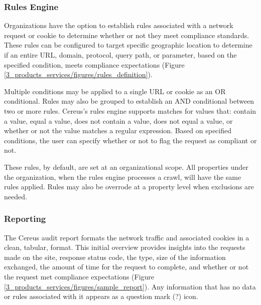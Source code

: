 
\subsubsection{Rules Engine}

Organizations have the option to establish rules associated with a network request or cookie to determine whether or not they meet compliance standards. These rules can be configured to target specific geographic location to determine if an entire URL, domain, protocol, query path, or parameter, based on the specified condition, meets compliance expectations (Figure \ref{3_products_services/figures/rules_definition}).

Multiple conditions may be applied to a single URL or cookie as an OR conditional. Rules may also be grouped to establish an AND conditional between two or more rules. Cereus's rules engine supports matches for values that: contain a value, equal a value, does not contain a value, does not equal a value, or whether or not the value matches a regular expression. Based on specified conditions, the user can specify whether or not to flag the request as compliant or not.


These rules, by default, are set at an organizational scope. All properties under the organization, when the rules engine processes a crawl, will have the same rules applied. Rules may also be overrode at a property level when exclusions are needed.

\subsubsection{Reporting}

The Cereus audit report formats the network traffic and associated cookies in a clean, tabular, format. This initial overview provides insights into the requests made on the site, response status code, the type, size of the information exchanged, the amount of time for the request to complete, and whether or not the request met compliance expectations (Figure \ref{3_products_services/figures/sample_report}). Any information that has no data or rules associated with it appears as a question mark (?) icon.

